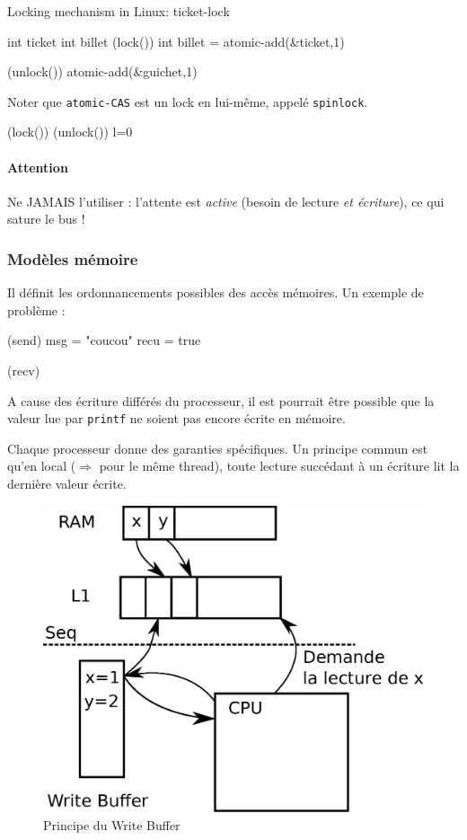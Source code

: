 \documentclass{article}
\begin{document}
Locking mechanism in Linux: ticket-lock\\
\begin{algorithm}[H]
int ticket\;
int billet\;
\Void({lock()}){
	int billet = atomic-add(\&ticket,1)\;
}

\Void({unlock()}){
	atomic-add(\&guichet,1)\;
}
\end{algorithm}

Noter que \texttt{atomic-CAS} est un lock en lui-même, appelé \texttt{spinlock}.
\begin{algorithm}
\Void({lock()}){
}
\Void({unlock()}){
	l=0\;
}
\end{algorithm}
\paragraph{Attention} Ne JAMAIS l'utiliser : l'attente est \emph{active} (besoin de lecture \emph{et écriture}), ce qui sature le bus !


\subsubsection{Modèles mémoire}
Il définit les ordonnancements possibles des accès mémoires. Un exemple de problème :

\begin{algorithm}[H]
\Label(send){
	msg = "coucou"\;
	recu = true\;
}

\Label(recv){
}
\end{algorithm}
A cause des écriture différés du processeur, il est pourrait être possible que la valeur lue par \texttt{printf} ne soient pas encore écrite en mémoire.
\bigskip

Chaque processeur donne des garanties spécifiques. Un principe commun est qu'en local ($\Rightarrow$ pour le même thread), toute lecture succédant à un écriture lit la dernière valeur écrite.

\begin{figure}[h]
\centering
\includegraphics[width=0.5\linewidth]{write_buffer.eps}
\caption{\label{fig:write_buffer}Principe du Write Buffer}
\end{figure}
\end{document}
